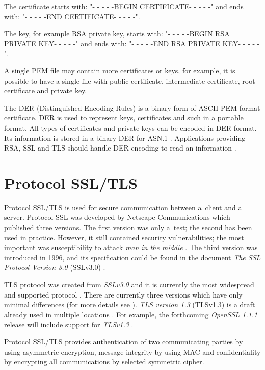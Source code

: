 \documentclass[
  12pt, 
  digital, %
  notable,   %
  nolof,     %
  nolot,     %
]{fithesis3}
\begin{document}
The certificate starts with: "- - - - -BEGIN CERTIFICATE- - - - -" and ends with: "- - - - -END CERTIFICATE- - - - -". 

The key, for example RSA private key, starts with: "- - - - -BEGIN RSA PRIVATE KEY- - - - -" and ends 
with: "- - - - -END RSA PRIVATE KEY- - - - -". 

A single PEM file may contain more certificates or keys, for example, it is possible to have a single file with public certificate, intermediate certificate, root certificate and private key.

The DER (Distinguished Encoding Rules) is a binary form of ASCII PEM format certificate. DER is used 
to represent keys, certificates and such in a portable format. All types of certificates and private 
keys can be encoded in DER format. Its information is stored in a binary DER for ASN.1 \cite{asn.1}. 
Applications providing RSA, SSL and TLS should handle DER encoding to read an information \cite{bakker_2014}. %

\section{Protocol SSL/TLS}
Protocol SSL/TLS is used for secure communication between a~client and a server. Protocol SSL was 
developed by Netscape Communications which published three versions. The first version was only 
a~test; the second has been used in practice. However, it still contained security vulnerabilities; 
the most important was susceptibility to attack \textit{man in the middle} \cite{oppliger2003security}. The third version was introduced in 1996, and its specification could 
be found in the document \textit{The SSL Protocol Version 3.0} (SSLv3.0) \cite{freier2011secure}. 

TLS protocol was created from \textit{SSLv3.0} and it is currently the most widespread and 
supported protocol \cite{oppliger2003security}. There are currently three versions which have only 
minimal differences (for more details see \cite{differences}). \textit{TLS version 1.3} (TLSv1.3) 
is a draft already used in multiple locations \cite{draft-tls}. For example, the forthcoming \textit{OpenSSL 1.1.1} release will include support for \textit{TLSv1.3} \cite{foundation2}.

Protocol SSL/TLS provides authentication of two communicating parties by using asymmetric 
encryption, message integrity by using MAC and confidentiality by encrypting all communications 
by selected symmetric cipher.
\end{document}
